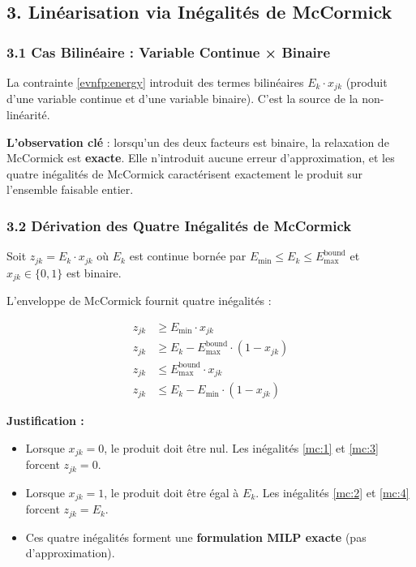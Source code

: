 \documentclass{article}
\begin{document}
\subsection{3. Linéarisation via Inégalités de McCormick}

\subsubsection{3.1 Cas Bilinéaire : Variable Continue × Binaire}

La contrainte \eqref{evnfp:energy} introduit des termes bilinéaires $E_k \cdot x_{jk}$ (produit d'une variable continue et d'une variable binaire). C'est la source de la non-linéarité.

\textbf{L'observation clé} : lorsqu'un des deux facteurs est binaire, la relaxation de McCormick est \textbf{exacte}. Elle n'introduit aucune erreur d'approximation, et les quatre inégalités de McCormick caractérisent exactement le produit sur l'ensemble faisable entier.

\subsubsection{3.2 Dérivation des Quatre Inégalités de McCormick}

Soit $z_{jk} = E_k \cdot x_{jk}$ où $E_k$ est continue bornée par $E_{\min} \le E_k \le E_{\max}^{\text{bound}}$ et $x_{jk} \in \{0, 1\}$ est binaire.

L'enveloppe de McCormick fournit quatre inégalités :

\begin{align}
z_{jk} &\ge E_{\min} \cdot x_{jk} \label{mc:1} \\
z_{jk} &\ge E_k - E_{\max}^{\text{bound}} \cdot (1 - x_{jk}) \label{mc:2} \\
z_{jk} &\le E_{\max}^{\text{bound}} \cdot x_{jk} \label{mc:3} \\
z_{jk} &\le E_k - E_{\min} \cdot (1 - x_{jk}) \label{mc:4}
\end{align}

\textbf{Justification :}
\begin{itemize}
    \item Lorsque $x_{jk} = 0$, le produit doit être nul. Les inégalités \eqref{mc:1} et \eqref{mc:3} forcent $z_{jk} = 0$.
    \item Lorsque $x_{jk} = 1$, le produit doit être égal à $E_k$. Les inégalités \eqref{mc:2} et \eqref{mc:4} forcent $z_{jk} = E_k$.
    \item Ces quatre inégalités forment une \textbf{formulation MILP exacte} (pas d'approximation).
\end{itemize}
\end{document}
